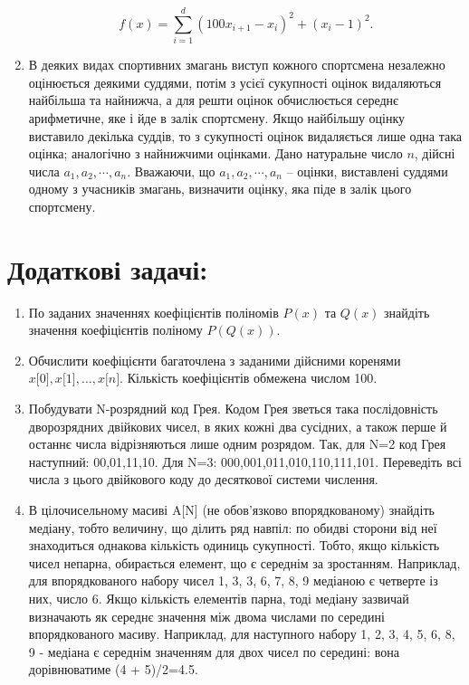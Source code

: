 \documentclass[a5paper,titlepage,openany,twoside,draft]{book_unv}%
\begin{document}
\begin{enumerate}
  $$ f(x) = \sum\limits_{i=1}^{d} (100x_{i+1} -x_{i})^{2} + (x_{i}-1)^2. $$  

\item
  В деяких видах спортивних змагань виступ кожного спортсмена незалежно
  оцінюється деякими суддями, потім з усієї сукупності оцінок
  видаляються найбільша та найнижча, а для решти оцінок
  обчислюється середнє арифметичне, яке і йде в залік спортсмену. Якщо
  найбільшу оцінку виставило декілька суддів, то з сукупності
  оцінок видаляється лише одна така оцінка; аналогічно з
  найнижчими оцінками. Дано натуральне число $n$, дійсні числа
  \(a_{1},a_{2},\cdots,a_{n}\). Вважаючи, що
  \(a_{1},a_{2},\cdots,a_{n}\) -- оцінки, виставлені суддями одному з
  учасників змагань, визначити оцінку, яка піде в залік цього
  спортсмену.
\end{enumerate}

\section{Додаткові задачі:}

\begin{enumerate}
\def\labelenumi{\arabic{enumi})}
\setcounter{enumi}{17}
\item
По заданих значеннях коефіцієнтів поліномів $P(x)$ та $Q(x)$ знайдіть
значення коефіцієнтів поліному $P(Q(x))$.
\item
  Обчислити коефіцієнти багаточлена з заданими дійсними коренями 
$ x{[}0{]},x{[}1{]}, \ldots{}, x{[}n{]}$. Кількість коефіцієнтів обмежена
  числом 100.
\item
  Побудувати N-розрядний код Грея. Кодом Грея зветься така послідовність
  дворозрядних двійкових чисел, в яких кожні два сусідних, а також перше
  й останнє числа відрізняються лише одним розрядом. Так, для N=2 код
  Грея наступний: 00,01,11,10. Для N=3: 000,001,011,010,110,111,101.
  Переведіть всі числа з цього двійкового коду до десяткової системи
  числення.
\item
  В цілочисельному масиві A{[}N{]} (не обов'язково впорядкованому)
  знайдіть медіану, тобто величину, що ділить ряд навпіл: по обидві
  сторони від неї знаходиться однакова кількість одиниць сукупності.
  Тобто, якщо кількість чисел непарна, обирається елемент, що є середнім
  за зростанням. Наприклад, для впорядкованого набору чисел 1, 3, 3, 6,
  7, 8, 9 медіаною є четверте із них, число 6. Якщо кількість елементів
  парна, тоді медіану зазвичай визначають як середнє значення між двома
  числами по середині впорядкованого масиву. Наприклад, для наступного
  набору 1, 2, 3, 4, 5, 6, 8, 9 - медіана є середнім значенням для двох
  чисел по середині: вона дорівнюватиме (4 + 5)/2=4.5.
\end{enumerate}
\end{document}
